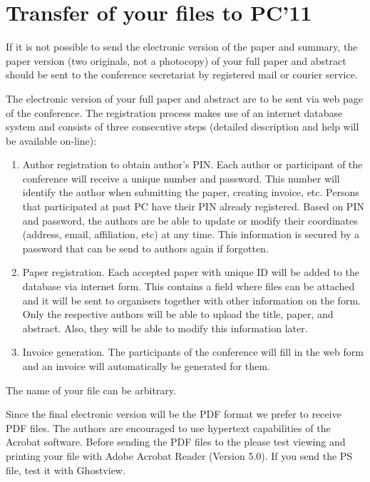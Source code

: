 \documentclass{ifacconf}
\begin{document}
\section{Transfer of your files to PC'11}

If it is not possible to send the electronic version of the paper and
summary, the paper version (two originals, not a photocopy) of your
full paper and abstract should be sent to the conference secretariat
by registered mail or courier service. 

The electronic version of your full paper and abstract are to be sent
via web page of the conference. The registration process makes use of
an internet database system and consists of three consecutive steps
(detailed description and help will be available on-line):
\begin{enumerate}
\item Author registration to obtain author's PIN. Each author or
  participant of the conference will receive a unique number and
  password. This number will identify the author when submitting the
  paper, creating invoice, etc. Persons that participated at past PC have
  their PIN already registered.  Based on PIN and password, the
  authors are be able to update or modify their coordinates (address,
  email, affiliation, etc) at any time. This information is secured by
  a password that can be send to authors again if forgotten.
\item Paper registration. Each accepted paper with unique ID will be
  added to the database via internet form. This contains a field where
  files can be attached and it will be sent to organisers together
  with other information on the form. Only the respective authors will
  be able to upload the title, paper, and abstract. Also, they will be
  able to modify this information later.
\item Invoice generation. The participants of the conference will
  fill in the web form and an invoice will automatically be generated
  for them. 
\end{enumerate}

The name of your file can be arbitrary.

Since the final electronic version will be the PDF format we prefer to
receive PDF files. The authors are encouraged to use hypertext
capabilities of the Acrobat software.  Before sending the PDF files to
the please test viewing and printing your file with Adobe Acrobat
Reader (Version 5.0). If you send the PS file, test it with
Ghostview. 
\end{document}
